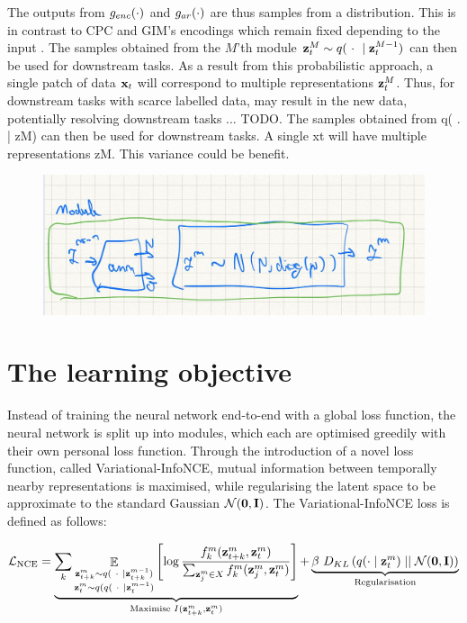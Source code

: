 			
		
		The outputs from $g_{enc}(\cdot)$ and $g_{ar}(\cdot)$ are thus samples from a distribution. This is in contrast to CPC and GIM's encodings which remain fixed depending to the input \cite{oordRepresentationLearningContrastive2019, lowePuttingEndEndtoEnd2020}. The samples obtained from the $M$'th module $\mathbf{z}_t^M \sim q(~\cdot~\mid \mathbf{z}_t^{M-1})$ can then be used for downstream tasks. As a result from this probabilistic approach, a single patch of data $\mathbf{x}_t$ will correspond to multiple representations $\mathbf{z}_t^M$. Thus, for downstream tasks with scarce labelled data, may result in the new data, potentially resolving downstream tasks ... TODO.
			The samples obtained from q( . | zM) can then be used for downstream tasks. A single xt will have multiple representations zM. This variance could be benefit. %
			
		\begin{figure} %
			\centering
			\includegraphics[width=0.7\linewidth]{temp_variational_module}
			\caption{}
			\label{fig:tempvariationalmodule}
		\end{figure}
		
		

		
\section{The learning objective}
	Instead of training the neural network end-to-end with a global loss function, the neural network is split up into modules, which each are optimised greedily with their own personal loss function. Through the introduction of a novel loss function, called Variational-InfoNCE, mutual information between temporally nearby representations is maximised, while regularising the latent space to be approximate to the standard Gaussian $\mathcal{N}(\bm{\mathbf{0}}, \mathbf{I})$. The Variational-InfoNCE loss is defined as follows:
	
	\begin{equation} %
		\Lnce =
		\underbrace{\reconstrgim}_{\text{Maximise } I(\ztk^m, \zt^m)} + \underbrace{\beta ~ \latentspaceconstraintgim}_{\text{Regularisation}}
		\label{eq:variational_gim_loss}
	\end{equation}


